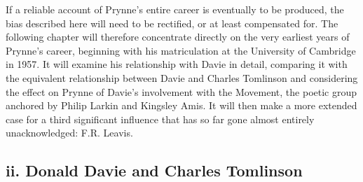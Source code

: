\documentclass[]{article}
\begin{document}
If a reliable account of Prynne’s entire career is eventually to be
produced, the bias described here will need to be rectified, or at least
compensated for. The following chapter will therefore concentrate
directly on the very earliest years of Prynne’s career, beginning with
his matriculation at the University of Cambridge in 1957. It will
examine his relationship with Davie in detail, comparing it with the
equivalent relationship between Davie and Charles Tomlinson and
considering the effect on Prynne of Davie’s involvement with the
Movement, the poetic group anchored by Philip Larkin and Kingsley Amis.
It will then make a more extended case for a third significant influence
that has so far gone almost entirely unacknowledged: F.R. Leavis.

\subsection{ii. Donald Davie and Charles
Tomlinson}\label{ii.-donald-davie-and-charles-tomlinson}
\end{document}
